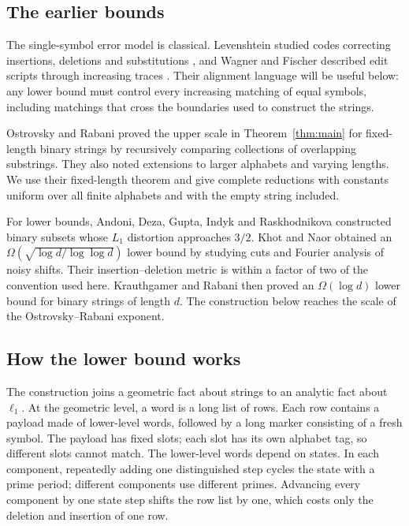 \subsection*{The earlier bounds}

The single-symbol error model is classical. Levenshtein studied codes
correcting insertions, deletions and substitutions
\cite{Levenshtein1966}, and Wagner and Fischer described edit scripts
through increasing traces \cite{WagnerFischer1974}. Their alignment
language will be useful below: any lower bound must control every
increasing matching of equal symbols, including matchings that cross the
boundaries used to construct the strings.

Ostrovsky and Rabani \cite{OstrovskyRabani2007} proved the upper scale in
Theorem~\ref{thm:main} for fixed-length binary strings by recursively
comparing collections of overlapping substrings. They also noted
extensions to larger alphabets and varying lengths. We use their
fixed-length theorem and give complete reductions with constants uniform
over all finite alphabets and with the empty string included.

For lower bounds, Andoni, Deza, Gupta, Indyk and Raskhodnikova
\cite{AndoniDezaGuptaIndykRaskhodnikova2003} constructed binary subsets
whose $L_1$ distortion approaches $3/2$. Khot and Naor
\cite[Theorem~4.1]{KhotNaor2006} obtained an
$\Omega(\sqrt{\log d/\log\log d})$ lower bound by
studying cuts and Fourier analysis of noisy shifts. Their
insertion--deletion metric is within a factor of two of the convention
used here. Krauthgamer and Rabani
\cite[Theorem~1.3]{KrauthgamerRabani2009} then proved an
$\Omega(\log d)$ lower bound for binary strings of length $d$.
The construction below reaches the scale of the Ostrovsky--Rabani
exponent.

\subsection*{How the lower bound works}

The construction joins a geometric fact about strings to an analytic
fact about $\ell_1$. At the geometric level, a word is a long list of
rows. Each row contains a payload made of lower-level words, followed by
a long marker consisting of a fresh symbol. The payload has fixed slots;
each slot has its own alphabet tag, so different slots cannot match.
The lower-level words depend on states. In each component, repeatedly
adding one distinguished step cycles the state with a prime period;
different components use different primes.
Advancing every component by one state step shifts the row list by one,
which costs only the deletion and insertion of one row.

